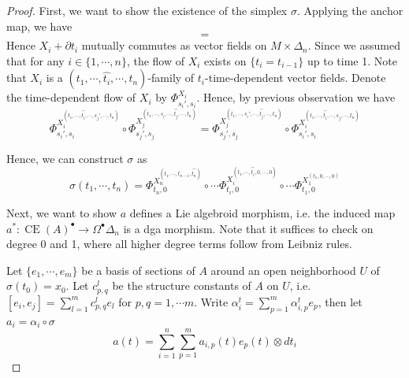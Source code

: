\documentclass[12pt]{amsart}
\theoremstyle{definition}
\theoremstyle{remark}
\numberwithin{equation}{section}
\newcommand{\del}{\partial}
\renewcommand{\del}{\partial}
\newcommand{\1}{{\mathbb{1}}}
\newcommand{\CE}{\operatorname{CE}}
\begin{document}
\begin{proof}
       First, we want to show the existence of the simplex $\sigma$. Applying the anchor map, we have 
    \begin{equation*}
        [\rho(\alpha_i), \rho(\alpha_j)] = 
    \end{equation*}
Hence $X_i + \del t_i$ mutually commutes as vector fields on $M \times \Delta_n$. Since we assumed that  for any $i\in \{1, \cdots, n\}$, the flow of $X_i$ exists on $\{ t_i = t_{i-1} \}$ up to time 1.   Note that $X_i$ is a $(t_1, \cdots, \hat{t_i}, \cdots, t_n )$-family of $t_i$-time-dependent vector fields. Denote the time-dependent flow of $X_i$ by $\Phi^{X_i}_{s_i', s_i}$. Hence, by previous observation we have
\begin{equation*}
    \Phi^{X_i^{(t_1, \cdots, \hat{t_i}, \cdots, s_j', \cdots, t_n )}}_{s_i', s_i} \circ \Phi^{X_j^{(t_1, \cdots, s_i, \cdots, \hat{t_j}, \cdots, t_n )}}_{s_j', s_j} = \Phi^{X_j^{(t_1, \cdots, s_i', \cdots, \hat{t_j}, \cdots, t_n )}}_{s_j', s_j} \circ \Phi^{X_i^{(t_1, \cdots, \hat{t_i}, \cdots, s_j, \cdots, t_n )}}_{s_i', s_i}
\end{equation*}

Hence, we can construct $\sigma$ as 
\begin{equation*}
    \sigma(t_1, \cdots, t_n) = \Phi^{X_n^{(t_1, \cdots, t_{n-1}, \hat{t_n} )}}_{t_n, 0}\circ \cdots \Phi^{X_i^{(t_1, \cdots, \hat{t_i}, 0, \cdots, 0 )}}_{t_i, 0}\circ \cdots \Phi^{X_1^{(t_1,  0, \cdots, 0 )}}_{t_1, 0}
\end{equation*}

Next, we want to show $a$ defines a Lie algebroid morphism, i.e. the induced map $a^*: \CE(A)^{\bullet} \to \Omega^{\bullet}\Delta_n$ is a dga morphism. Note that it suffices to check on degree 0 and 1, where all higher degree terms follow from Leibniz rules.

Let $\{e_1, \cdots, e_m\}$ be a basis of sections of $A$ around an open neighborhood $U$ of $\sigma(t_0) = x_0$. Let $c^l_{p,q}$ be the structure constants of $A$ on $U$, i.e. $[e_i, e_j] = \sum_{l=1}^m c^l_{p,q} e_l$ for $p,q = 1, \cdots m$. 
Write $\alpha^t_i = \sum_{p=1}^m \alpha^t_{i,p} e_p$, then let $a_i = \alpha_i \circ \sigma$
\begin{equation*}
    a(t) = \sum_{i=1}^n\sum_{p = 1}^m a_{i,p}(t)e_p(t) \otimes dt_i
\end{equation*}


\end{proof}
\end{document}
